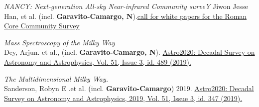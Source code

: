 \documentclass[14pt]{article}
\begin{document}
\begin{etaremune}
  \setcounter{enumi}{4}
\item \textit{NANCY: Next-generation All-sky Near-infrared Community surveY}
  Jiwon Jesse Han, et al. (incl. \textbf{Garavito-Camargo,
  N}).\href{https://arxiv.org/abs/2306.11784}{call for white papers for the
  Roman Core Community Survey}
\item \textit{Mass Spectroscopy of the Milky Way} \\
  Dey, Arjun. et al., (incl. \textbf{Garavito-Camargo, N}).
  \href{https://113qx216in8z1kdeyi404hgf-wpengine.netdna-ssl.com/wp-content/uploads/2019/05/489_dey.pdf}{Astro2020: Decadal
  Survey on Astronomy and Astrophysics, Vol. 51, Issue 3, id. 489 (2019).}
\item \textit{The Multidimensional Milky Way.}\\
 Sanderson, Robyn E .et al. (incl. \textbf{Garavito-Camargo}) 2019.
  \href{https://arxiv.org/abs/1909.07641}{Astro2020: Decadal Survey on
Astronomy and Astrophysics, 2019, Vol. 51, Issue 3, id. 347 (2019).} 
\end{etaremune}
\end{document}
